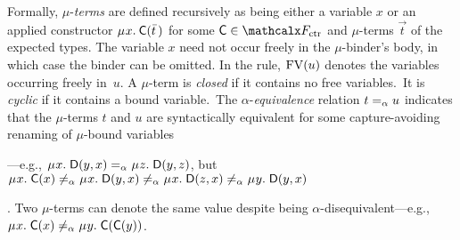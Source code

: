 Formally, $\mu$-\emph{terms} are defined recursively as being either a variable $x$
or an applied constructor
$\MU x.\: \const{C}( \vec t\, )$ for some $\const{C} \in \Ctr$ and
$\mu$-terms $\vec t$ of the expected types.
The variable $x$ need not occur freely in the $\mu$-binder's body, in which case
the binder can be omitted.
In the  rule,
$\mathrm{FV}( u )$ denotes the variables occurring freely in~$u$.
%
%
%
A $\mu$-term is \emph{closed} if %
it contains no free variables. \,It is \emph{cyclic} if %
it contains a bound variable. \,The
\goodbreak %
\noindent
$\alpha$-\emph{equivalence} relation $t \mathrel{=_\alpha} u$
indicates that the $\mu$-terms $t$ and $u$
are syntactically equivalent for some capture-avoiding renaming of $\mu$-bound variables\begin{rep}---e.g.,
$\MU x.\; \const{D}( y, x ) \aequiv \MU z.\; \const{D}( y, z )$,
but
$\MU x.\; \const{C}( x ) \not\aequiv \MU x.\; \const{D}( y, x ) \not\aequiv \MU x.\; \const{D}( z, x )
\not\aequiv \MU y.\; \const{D}( y, x )$\end{rep}.
Two $\mu$-terms can denote the same value despite being $\alpha$-disequivalent---e.g.,
$\MU x.\; \const{C}( x ) \not\aequiv \MU y.\; \const{C}( \const{C}( y ) )$.

